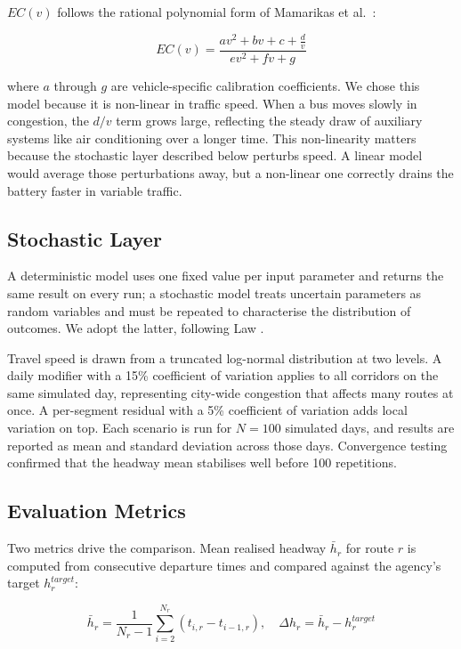 \documentclass[conference]{IEEEtran}
\begin{document}
$EC(v)$ follows the rational polynomial form of Mamarikas et al.\
\cite{mamarikas2025}:

\begin{equation}
EC(v) = \frac{a v^2 + b v + c + \frac{d}{v}}{e v^2 + f v + g}
\label{eq:ec-mamarikas}
\end{equation}

where $a$ through $g$ are vehicle-specific calibration coefficients. We
chose this model because it is non-linear in traffic speed. When a bus
moves slowly in congestion, the $d/v$ term grows large, reflecting the
steady draw of auxiliary systems like air conditioning over a longer
time. This non-linearity matters because the stochastic layer described
below perturbs speed. A linear model would average those perturbations
away, but a non-linear one correctly drains the battery faster in
variable traffic.

\subsection{Stochastic Layer}

A deterministic model uses one fixed value per input parameter and
returns the same result on every run; a stochastic model treats uncertain
parameters as random variables and must be repeated to characterise the
distribution of outcomes. We adopt the latter, following Law
\cite{law2015}.

Travel speed is drawn from a truncated log-normal distribution at two
levels. A daily modifier with a 15\% coefficient of variation applies to
all corridors on the same simulated day, representing city-wide
congestion that affects many routes at once. A per-segment residual with
a 5\% coefficient of variation adds local variation on top. Each scenario
is run for $N=100$ simulated days, and results are reported as mean and
standard deviation across those days. Convergence testing confirmed that
the headway mean stabilises well before 100 repetitions.

\subsection{Evaluation Metrics}

Two metrics drive the comparison. Mean realised headway $\bar{h}_r$ for
route $r$ is computed from consecutive departure times and compared
against the agency's target $h_r^{target}$:

\begin{equation}
\bar{h}_r = \frac{1}{N_r - 1} \sum_{i=2}^{N_r} (t_{i,r} - t_{i-1,r}),
\quad \Delta h_r = \bar{h}_r - h_r^{target}
\label{eq:headway}
\end{equation}
\end{document}
